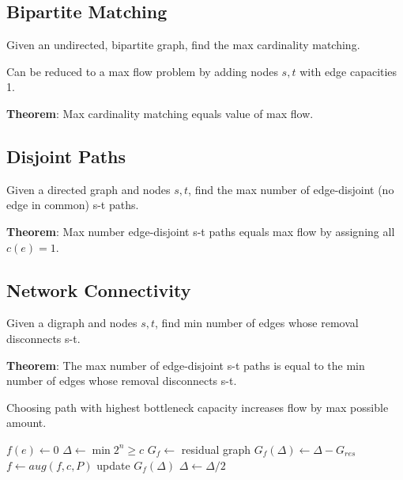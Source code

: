 \subsection*{Bipartite Matching}
Given an undirected, bipartite graph, find the max cardinality matching. 

Can be reduced to a max flow problem by adding nodes $s,t$ with edge capacities 1. 

\textbf{Theorem}: Max cardinality matching equals value of max flow. 

\subsection*{Disjoint Paths}
Given a directed graph and nodes $s,t$, find the max number of edge-disjoint (no edge in common) s-t paths. 

\textbf{Theorem}: Max number edge-disjoint s-t paths equals max flow by assigning all $c(e) = 1$. 

\subsection*{Network Connectivity}
Given a digraph and nodes $s,t$, find min number of edges whose removal disconnects s-t. 

\textbf{Theorem}: The max number of edge-disjoint s-t paths is equal to the min number of edges whose removal disconnects s-t. 

Choosing path with highest bottleneck capacity increases flow by max possible amount. 

\begin{algorithm}[H]
\begin{algorithmic}[1]
 $f(e) \gets 0$
\EndFor
\State $\Delta \gets \min 2^n \geq c$
\State $G_f \gets $ residual graph
\State $G_f(\Delta) \gets \Delta-G_{res}$
\State $f \gets aug(f,c,P)$
\State update $G_f(\Delta)$
\EndWhile
\State $\Delta \gets \Delta / 2$
\EndWhile
\State {}
\EndProcedure
\end{algorithmic}
\end{algorithm}
